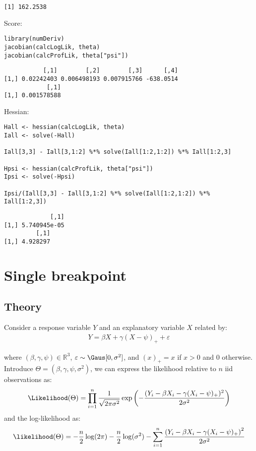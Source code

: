 \documentclass[12pt]{article}
\newcommand\Real{\mathbb{R}}
\begin{document}
\begin{verbatim}
[1] 162.2538
\end{verbatim}



Score:
\lstset{language=r,label= ,caption= ,captionpos=b,numbers=none}
\begin{lstlisting}
library(numDeriv)
jacobian(calcLogLik, theta)
jacobian(calcProfLik, theta["psi"])
\end{lstlisting}
\begin{verbatim}
           [,1]        [,2]        [,3]      [,4]
[1,] 0.02242403 0.006498193 0.007915766 -638.0514
            [,1]
[1,] 0.001578588
\end{verbatim}


Hessian:
\lstset{language=r,label= ,caption= ,captionpos=b,numbers=none}
\begin{lstlisting}
Hall <- hessian(calcLogLik, theta)
Iall <- solve(-Hall)

Iall[3,3] - Iall[3,1:2] %*% solve(Iall[1:2,1:2]) %*% Iall[1:2,3]

Hpsi <- hessian(calcProfLik, theta["psi"])
Ipsi <- solve(-Hpsi)

Ipsi/(Iall[3,3] - Iall[3,1:2] %*% solve(Iall[1:2,1:2]) %*% Iall[1:2,3])

\end{lstlisting}

\begin{verbatim}
             [,1]
[1,] 5.740945e-05
         [,1]
[1,] 4.928297
\end{verbatim}


\clearpage

\section{Single breakpoint}
\label{sec:orgf7a689f}

\subsection{Theory}
\label{sec:org24f261c}

Consider a response variable \(Y\) and an explanatory variable \(X\)
related by:
\begin{align*}
Y = \beta X + \gamma (X - \psi)_+ + \varepsilon
\end{align*}

\noindent where \((\beta,\gamma,\psi) \in \Real^3\), \(\varepsilon
\sim \Gaus[0,\sigma^2]\), and \((x)_+=x\) if \(x>0\) and 0
otherwise. Introduce \(\Theta = (\beta,\gamma,\psi,\sigma^2)\), we can
express the likelihood relative to \(n\) iid observations as:
\begin{align*}
\Likelihood(\Theta) = \prod_{i=1}^n \frac{1}{\sqrt{2\pi\sigma^2}}\exp\left(-\frac{(Y_i - \beta X_i - \gamma (X_i - \psi)_+)^2}{2\sigma^2}\right)
\end{align*}
and the log-likelihood as:
\begin{align*}
\likelihood(\Theta) = - \frac{n}{2} \log(2\pi) - \frac{n}{2} \log(\sigma^2) - \sum_{i=1}^n \frac{\left(Y_i - \beta X_i - \gamma (X_i - \psi)_+\right)^2}{2\sigma^2}
\end{align*}
\end{document}
